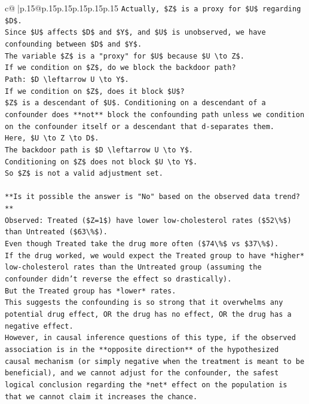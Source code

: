 \documentclass{article}
\begin{document}
{\begin{supertabular}{c@{$\;$}|p{.15\linewidth}@{}p{.15\linewidth}p{.15\linewidth}p{.15\linewidth}p{.15\linewidth}p{.15\linewidth}}
{{{\texttt{Actually, \$Z\$ is a proxy for \$U\$ regarding \$D\$.} \\
\texttt{Since \$U\$ affects \$D\$ and \$Y\$, and \$U\$ is unobserved, we have confounding between \$D\$ and \$Y\$.} \\
\texttt{The variable \$Z\$ is a "proxy" for \$U\$ because \$U \textbackslash{}to Z\$.} \\
\texttt{If we condition on \$Z\$, do we block the backdoor path?} \\
\texttt{Path: \$D \textbackslash{}leftarrow U \textbackslash{}to Y\$.} \\
\texttt{If we condition on \$Z\$, does it block \$U\$?} \\
\texttt{\$Z\$ is a descendant of \$U\$. Conditioning on a descendant of a confounder does **not** block the confounding path unless we condition on the confounder itself or a descendant that d{-}separates them.} \\
\texttt{Here, \$U \textbackslash{}to Z \textbackslash{}to D\$.} \\
\texttt{The backdoor path is \$D \textbackslash{}leftarrow U \textbackslash{}to Y\$.} \\
\texttt{Conditioning on \$Z\$ does not block \$U \textbackslash{}to Y\$.} \\
\texttt{So \$Z\$ is not a valid adjustment set.} \\
\\ 
\texttt{**Is it possible the answer is "No" based on the observed data trend?**} \\
\texttt{Observed: Treated (\$Z=1\$) have lower low{-}cholesterol rates (\$52\textbackslash{}\%\$) than Untreated (\$63\textbackslash{}\%\$).} \\
\texttt{Even though Treated take the drug more often (\$74\textbackslash{}\%\$ vs \$37\textbackslash{}\%\$).} \\
\texttt{If the drug worked, we would expect the Treated group to have *higher* low{-}cholesterol rates than the Untreated group (assuming the confounder didn't reverse the effect so drastically).} \\
\texttt{But the Treated group has *lower* rates.} \\
\texttt{This suggests the confounding is so strong that it overwhelms any potential drug effect, OR the drug has no effect, OR the drug has a negative effect.} \\
\texttt{However, in causal inference questions of this type, if the observed association is in the **opposite direction** of the hypothesized causal mechanism (or simply negative when the treatment is meant to be beneficial), and we cannot adjust for the confounder, the safest logical conclusion regarding the *net* effect on the population is that we cannot claim it increases the chance.} \\
}}}
\end{supertabular}}
\end{document}
